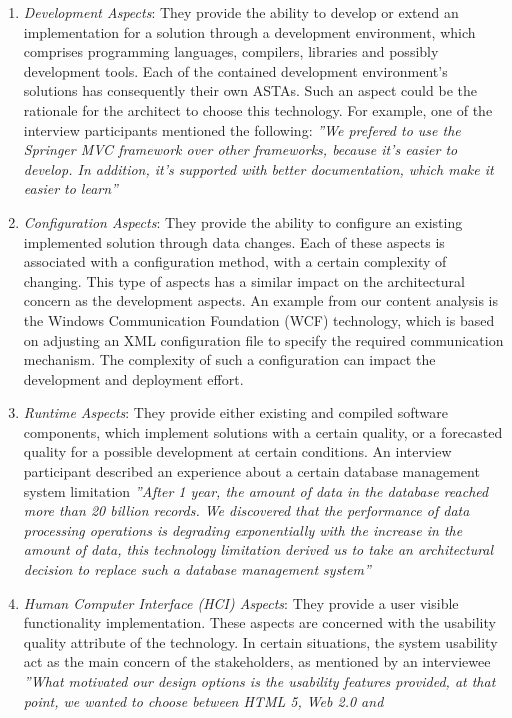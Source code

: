\documentclass[conference]{IEEEtran}
\begin{document}
\begin{enumerate}
\item \textit{Development Aspects}: They provide the ability to develop or
extend an implementation for a solution through a development environment, which
comprises programming languages, compilers, libraries and possibly development
tools. Each of the contained development environment’s solutions has
consequently their own ASTAs. Such an aspect could be the rationale for
the architect to choose this technology. For example, one of the interview
participants mentioned the following: \textit{''We prefered to use the Springer
MVC framework over other frameworks, because it's easier to develop. In addition,
it's supported with better documentation, which make it easier to learn''}
\item \textit{Configuration Aspects}: They provide the ability to
configure an existing implemented solution through data changes.
Each of these aspects is associated with a configuration method, with a certain
complexity of changing. This type of aspects has a similar impact on the
architectural concern as the development aspects. An example from our content
analysis is the Windows Communication Foundation (WCF) technology, which is
based on adjusting an XML configuration file to specify the required
communication mechanism. The complexity of such a configuration can impact the
development and deployment effort.
\item \textit{Runtime Aspects}: They provide either existing and compiled
software components, which implement solutions with a certain quality,
or a forecasted quality for a possible development at certain conditions. An
interview participant described an experience about a certain database
management system limitation \textit{''After 1 year, the amount of data in the
database reached more than 20 billion records. We discovered that the performance of
data processing operations is degrading exponentially with the increase in the
amount of data, this technology limitation derived us to take an architectural
decision to replace such a database management system''}
\item \textit{Human Computer Interface (HCI) Aspects}: They provide a user
visible functionality implementation. These aspects are concerned with the
usability quality attribute of the technology. In certain situations, the system
usability act as the main concern of the stakeholders, as mentioned by an
interviewee \textit{''What motivated our design options is the usability
features provided, at that point, we wanted to choose between HTML 5, Web 2.0 and
}
\end{enumerate}
\end{document}
